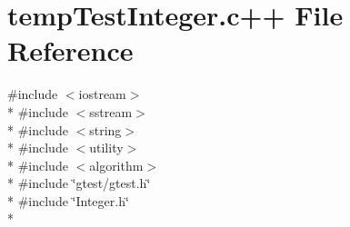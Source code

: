 \hypertarget{temp_test_integer_8c_09_09}{\section{temp\-Test\-Integer.\-c++ File Reference}
\label{temp_test_integer_8c_09_09}
}
{\ttfamily \#include $<$iostream$>$}\\*
{\ttfamily \#include $<$sstream$>$}\\*
{\ttfamily \#include $<$string$>$}\\*
{\ttfamily \#include $<$utility$>$}\\*
{\ttfamily \#include $<$algorithm$>$}\\*
{\ttfamily \#include \char`\"{}gtest/gtest.\-h\char`\"{}}\\*
{\ttfamily \#include \char`\"{}Integer.\-h\char`\"{}}\\*
